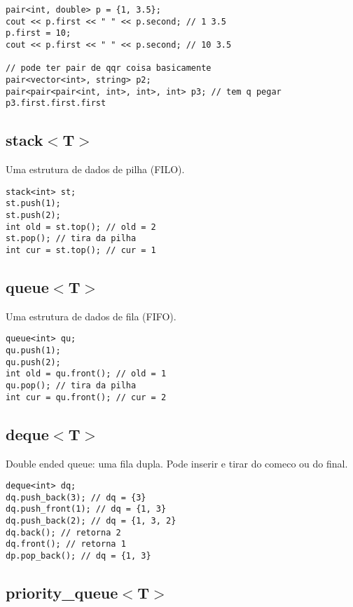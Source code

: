 \begin{lstlisting}
pair<int, double> p = {1, 3.5};
cout << p.first << " " << p.second; // 1 3.5
p.first = 10;
cout << p.first << " " << p.second; // 10 3.5

// pode ter pair de qqr coisa basicamente
pair<vector<int>, string> p2;
pair<pair<pair<int, int>, int>, int> p3; // tem q pegar p3.first.first.first
\end{lstlisting}
    
\subsection{stack$<$T$>$}

Uma estrutura  de dados de pilha (FILO).

\begin{lstlisting}
stack<int> st;
st.push(1);
st.push(2);
int old = st.top(); // old = 2
st.pop(); // tira da pilha
int cur = st.top(); // cur = 1
\end{lstlisting}

\subsection{queue$<$T$>$}

Uma estrutura  de dados de fila (FIFO).

\begin{lstlisting}
queue<int> qu;
qu.push(1);
qu.push(2);
int old = qu.front(); // old = 1
qu.pop(); // tira da pilha
int cur = qu.front(); // cur = 2
\end{lstlisting}

\subsection{deque$<$T$>$}

Double ended queue: uma fila dupla. Pode inserir e tirar do comeco ou do final.

\begin{lstlisting}
deque<int> dq;
dq.push_back(3); // dq = {3}
dq.push_front(1); // dq = {1, 3}
dq.push_back(2); // dq = {1, 3, 2}
dq.back(); // retorna 2
dq.front(); // retorna 1
dp.pop_back(); // dq = {1, 3}
\end{lstlisting}

\subsection{priority\_queue$<$T$>$}

